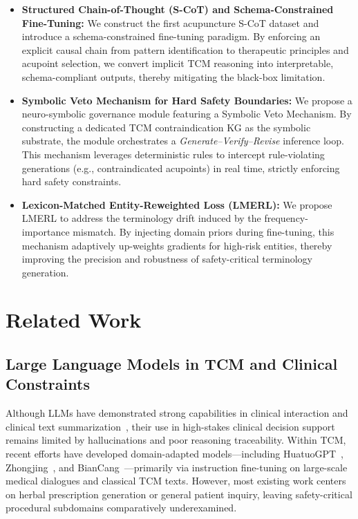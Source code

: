 \documentclass[preprint,5p,times,twocolumn,fleqn]{elsarticle}
\begin{document}
\begin{itemize}
    \item \textbf{Structured Chain-of-Thought (S-CoT) and Schema-Constrained Fine-Tuning:} 
    We construct the first acupuncture S-CoT dataset and introduce a schema-constrained fine-tuning paradigm. 
    By enforcing an explicit causal chain from pattern identification to therapeutic principles and acupoint selection, we convert implicit TCM reasoning into interpretable, schema-compliant outputs, thereby mitigating the black-box limitation.

    \item \textbf{Symbolic Veto Mechanism for Hard Safety Boundaries:}
    We propose a neuro-symbolic governance module featuring a Symbolic Veto Mechanism.
    By constructing a dedicated TCM contraindication KG as the symbolic substrate, the module orchestrates a \textit{Generate--Verify--Revise} inference loop.
    This mechanism leverages deterministic rules to intercept rule-violating generations (e.g., contraindicated acupoints) in real time, strictly enforcing hard safety constraints.

    \item \textbf{Lexicon-Matched Entity-Reweighted Loss (LMERL):} 
    We propose LMERL to address the terminology drift induced by the frequency-importance mismatch. 
    By injecting domain priors during fine-tuning, this mechanism adaptively up-weights gradients for high-risk entities, thereby improving the precision and robustness of safety-critical terminology generation.
\end{itemize}

\section{Related Work}
\subsection{Large Language Models in TCM and Clinical Constraints}

Although LLMs have demonstrated strong capabilities in clinical interaction and clinical text summarization~\citep{singhal_medpalm_2023}, their use in high-stakes clinical decision support remains limited by hallucinations and poor reasoning traceability. 
Within TCM, recent efforts have developed domain-adapted models---including HuatuoGPT~\citep{zhang_huatuogpt_2023}, Zhongjing~\citep{yang_zhongjing_2023}, and BianCang~\citep{wei_biancang_2025}---primarily via instruction fine-tuning on large-scale medical dialogues and classical TCM texts. 
However, most existing work centers on herbal prescription generation or general patient inquiry, leaving safety-critical procedural subdomains comparatively underexamined.
\end{document}
